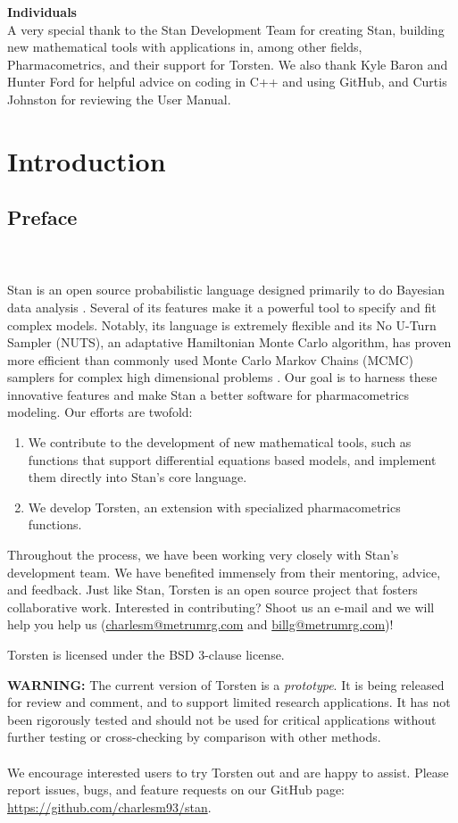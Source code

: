 \documentclass[11pt]{amsart}
\let\oldsection\section
\renewcommand\section{\clearpage\oldsection}
\newenvironment{fmpage}[1]
     {\begin{lrbox}{\fmbox}\begin{minipage}{#1}}
     {\end{minipage}\end{lrbox}\fbox{\usebox{\fmbox}}}
\begin{document}
{\bf Individuals} \ \\
A very special thank to the Stan Development Team for creating Stan, building new mathematical tools with applications in, among other fields, Pharmacometrics, and their support for Torsten. We also thank Kyle Baron and Hunter Ford for helpful advice on coding in C++ and using GitHub, and Curtis Johnston for reviewing the User Manual. 

\section{Introduction}

\subsection{Preface} \ \\ \ \\ Stan is an open source probabilistic language designed primarily to do Bayesian data analysis \cite{stan}. Several of its features make it a powerful tool to specify and fit complex models. Notably, its language is extremely flexible and its No U-Turn Sampler (NUTS), an adaptative Hamiltonian Monte Carlo algorithm, has proven more efficient than commonly used Monte Carlo Markov Chains (MCMC) samplers for complex high dimensional problems \cite{nuts}. Our goal is to harness these innovative features and make Stan a better software for pharmacometrics modeling. Our efforts are twofold:
\begin{enumerate}
  \item We contribute to the development of new mathematical tools, such as functions that support differential equations based models, and implement them directly into Stan's core language.
  \item We develop Torsten, an extension with specialized pharmacometrics functions.
\end{enumerate}

Throughout the process, we have been working very closely with Stan's development team. We have benefited immensely from their mentoring, advice, and feedback. Just like Stan, Torsten is an open source project that fosters collaborative work. Interested in contributing? Shoot us an e-mail and we will help you help us (\url{charlesm@metrumrg.com} and \url{billg@metrumrg.com})!

Torsten is licensed under the BSD 3-clause license.

\begin{fmpage}{\textwidth}
{\bf WARNING:} The current version of Torsten is a {\em prototype}. It is being released for review and comment, and to support limited research applications. It has not been rigorously tested and should not be used for critical applications without further testing or cross-checking by comparison with other methods. \\ \ \\
We encourage interested users to try Torsten out and are happy to assist. Please report issues, bugs, and feature requests on our GitHub page: \url{https://github.com/charlesm93/stan}.
\end{fmpage}
\end{document}
